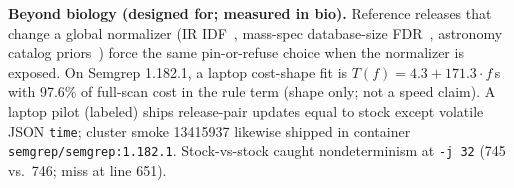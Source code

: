 \documentclass[letterpaper,twocolumn,10pt]{article}
\theoremstyle{definition}
\providecommand{\DIFaddend}{} %
\DeclareRobustCommand{\DIFaddend}{\DIFOaddend \let\includegraphics\DIFOincludegraphics} %
\begin{document}
\DIFaddend \textbf{Beyond biology (designed for; measured in bio).}
Reference releases that change a global normalizer (IR IDF~\cite{hadjieleftheriou2009incremental,staudinger2024reproducible}, mass\nobreakdash-spec database\nobreakdash-size {FDR}~\cite{frank2011spectral,aggarwal2022fdr}, astronomy catalog priors~\cite{delchambre2023gaia}) force the same pin\nobreakdash-or\nobreakdash-refuse choice when the normalizer is exposed.
On Semgrep 1.182.1, a laptop cost\nobreakdash-shape fit is $T(f){=}4.3{+}171.3\cdot f$\,s with 97.6\% of full\nobreakdash-scan cost in the rule term (shape only; not a speed claim).
A laptop pilot (labeled) ships release\nobreakdash-pair updates equal to stock except volatile JSON \texttt{time}; cluster smoke 13415937 likewise shipped in container \texttt{semgrep/semgrep:1.182.1}.
Stock\nobreakdash-vs\nobreakdash-stock caught nondeterminism at \texttt{-j 32} (745 vs.\ 746; miss at line 651).
\end{document}
